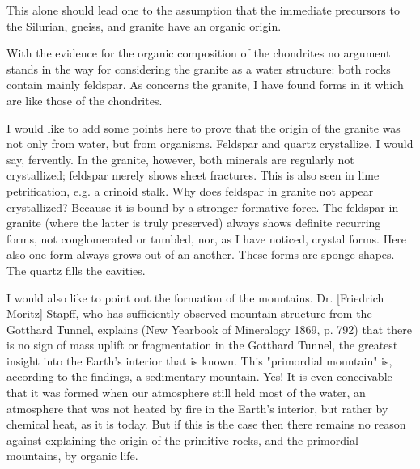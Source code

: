 \documentclass[a4paper, 12pt, oneside]{article}
\begin{document}
This alone should lead one to the assumption that the immediate precursors to the Silurian, gneiss, and granite have an organic origin.

With the evidence for the organic composition of the chondrites no argument stands in the way for considering the granite as a water structure: both rocks contain mainly feldspar. As concerns the granite, I have found forms in it which are like those of the chondrites.

I would like to add some points here to prove that the origin of the granite was not only from water, but from organisms. Feldspar and quartz crystallize, I would say, fervently. In the granite, however, both minerals are regularly not crystallized; feldspar merely shows sheet fractures. This is also seen in lime petrification, e.g. a crinoid stalk. Why does feldspar in granite not appear crystallized? Because it is bound by a stronger formative force. The feldspar in granite (where the latter is truly preserved) always shows definite recurring forms, not conglomerated or tumbled, nor, as I have noticed, crystal forms. Here also one form always grows out of an another. These forms are sponge shapes. The quartz fills the cavities.

I would also like to point out the formation of the mountains. Dr. [Friedrich Moritz] Stapff, who has sufficiently observed mountain structure from the Gotthard Tunnel, explains (New Yearbook of Mineralogy 1869, p. 792) that there is no sign of mass uplift or fragmentation in the Gotthard Tunnel, the greatest insight into the Earth's interior that is known. This "primordial mountain" is, according to the findings, a sedimentary mountain. Yes! It is even conceivable that it was formed when our atmosphere still held most of the water, an atmosphere that was not heated by fire in the Earth's interior, but rather by chemical heat, as it is today. But if this is the case then there remains no reason against explaining the origin of the primitive rocks, and the primordial mountains, by organic life.
\end{document}
